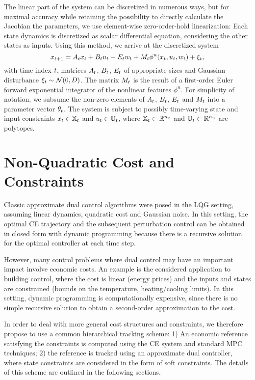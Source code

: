 The linear part of the system can be discretized in numerous ways, but for
maximal accuracy while retaining the possibility to directly calculate the
Jacobian \wrt the parameters, we use element-wise zero-order-hold linearization:
Each state dynamics is discretized as scalar differential equation,
considering the other states as inputs. Using this method, we arrive at the
discretized system
\begin{equation}
  \label{eq:discrete-system}
  x_{\tk+1} = A_\tk x_\tk + B_\tk u_\tk + E_\tk w_\tk + M_\tk
\phi^n(x_\tk,u_\tk,w_\tk) + \xi_\tk,
\end{equation}
with time index $t$, matrices $A_t$, $B_t$, $E_t$ of appropriate sizes
and Gaussian disturbance $\xi_t\sim\mathcal{N}(0,D)$. The matrix $M_t$ is the
result of a first-order Euler forward exponential integrator
\cite{Hochbruck.Ostermann:2010:Exponential} of the nonlinear features $\phi^n$.
For simplicity of notation, we subsume the non-zero elements of $A_t$,
$B_t$, $E_t$ and $M_t$ into a parameter vector $\theta_t$.
The system is subject to possibly time-varying state and input constraints
$x_t\in\mathbb{X}_t$ and $u_t\in\mathbb{U}_t$, where $\mathbb{X}_t\subset\mathbb{R}^{n_x}$ and
$\mathbb{U}_t\subset\mathbb{R}^{n_u}$ are polytopes.

\section{Non-Quadratic Cost and Constraints}
\label{sec:linear-systems-soft-constraints}

Classic approximate dual control algorithms were posed in the LQG setting,
assuming linear dynamics, quadratic cost and Gaussian noise. In this setting,
the optimal CE trajectory and the subsequent perturbation control can be
obtained in closed form with dynamic programming because there is a recursive
solution for the optimal controller at each time step.

However, many control problems where dual control may have an important impact
involve economic costs. An example is the considered application to building
control, where the cost is linear (energy prices) and the inputs and states are
constrained (bounds on the temperature, heating/cooling limits). In this
setting, dynamic programming is computationally expensive, since there is no
simple recursive solution to obtain a second-order approximation to the cost.

In order to deal with more general cost structures and constraints, we
therefore propose to use a common hierarchical tracking scheme: 1) An economic
reference satisfying the constraints is computed using the CE system and
standard MPC techniques; 2) the reference is tracked using an approximate dual
controller, where state constraints are considered in the form of soft
constraints. The details of this scheme are outlined in the following sections.

